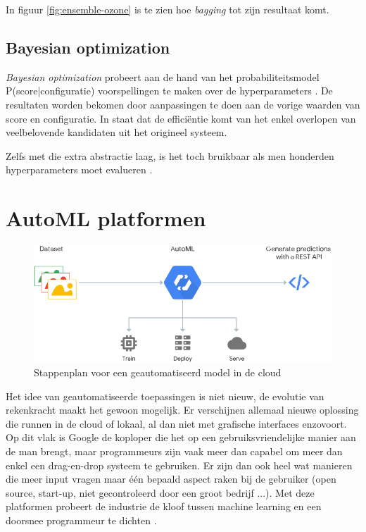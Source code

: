 In figuur \ref{fig:ensemble-ozone} is te zien hoe \textit{bagging} tot zijn resultaat komt.

\subsection{Bayesian optimization}
\label{subsec:bayesian}

\textit{Bayesian optimization} probeert aan de hand van het probabiliteitsmodel P(score|configuratie) voorspellingen te maken over de hyperparameters \autocite{Bergstra2013}. De resultaten worden bekomen door aanpassingen te doen aan de vorige waarden van score en configuratie. In \textcite{Bergstra2013} staat dat de efficiëntie komt van het enkel overlopen van veelbelovende kandidaten uit het origineel systeem.

Zelfs met die extra abstractie laag, is het toch bruikbaar als men honderden hyperparameters moet evalueren \autocite{Bergstra2013}.

\section{AutoML platformen}
\label{sec:automl-platformen}

\begin{figure}
    \includegraphics[width=\linewidth]{img/google-cloud-automl.png}
    \caption{Stappenplan voor een geautomatiseerd model in de cloud \autocite{Google2019}}
    \label{fig:google-cloud-automl}
\end{figure}

Het idee van geautomatiseerde toepassingen is niet nieuw, de evolutie van rekenkracht maakt het gewoon mogelijk. Er verschijnen allemaal nieuwe oplossing die runnen in de cloud of lokaal, al dan niet met grafische interfaces enzovoort. Op dit vlak is Google de koploper die het op een gebruiksvriendelijke manier aan de man brengt, maar programmeurs zijn vaak meer dan capabel om meer dan enkel een drag-en-drop systeem te gebruiken. Er zijn dan ook heel wat manieren die meer input vragen maar één bepaald aspect raken bij de gebruiker (open source, start-up, niet gecontroleerd door een groot bedrijf ...). Met deze platformen probeert de industrie de kloof tussen machine learning en een doorsnee programmeur te dichten \autocite{Gutierrez2019}.

